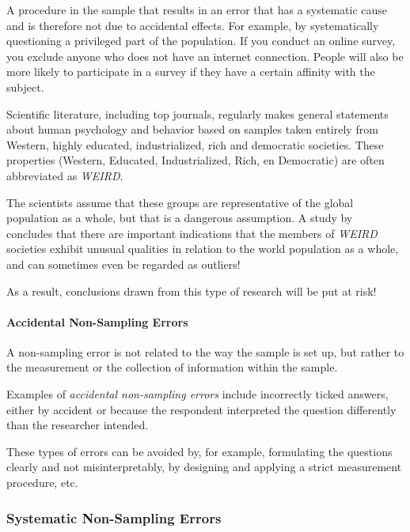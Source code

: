 A procedure in the sample that results in an error that has a systematic cause and is therefore not due to accidental effects.
For example, by systematically questioning a privileged part of the population.
If you conduct an online survey, you exclude anyone who does not have an internet connection.
People will also be more likely to participate in a survey if they have a certain affinity with the subject.

\begin{example}
    Scientific literature, including top journals, regularly makes general statements about human psychology and behavior based on samples taken entirely from Western, highly educated, industrialized, rich and democratic societies. These properties (Western, Educated, Industrialized, Rich, en Democratic) are often abbreviated as \emph{WEIRD}.
    
    The scientists assume that these groups are representative of the global population as a whole, but that is a dangerous assumption.
    A study by~\textcite{HenrichEtAl2010} concludes that there are important indications that the members of \emph{WEIRD} societies exhibit unusual qualities in relation to the world population as a whole, and can sometimes even be regarded as outliers!
    
    As a result, conclusions drawn from this type of research will be put at risk!
\end{example}

\paragraph{Accidental Non-Sampling Errors}

A non-sampling error is not related to the way the sample is set up, but rather to the measurement or the collection of information within the sample.

Examples of \emph{accidental non-sampling errors} include incorrectly ticked answers, either by accident or because the respondent interpreted the question differently than the researcher intended.

These types of errors can be avoided by, for example, formulating the questions clearly and not misinterpretably, by designing and applying a strict measurement procedure, etc.

\subsubsection{Systematic Non-Sampling Errors}


